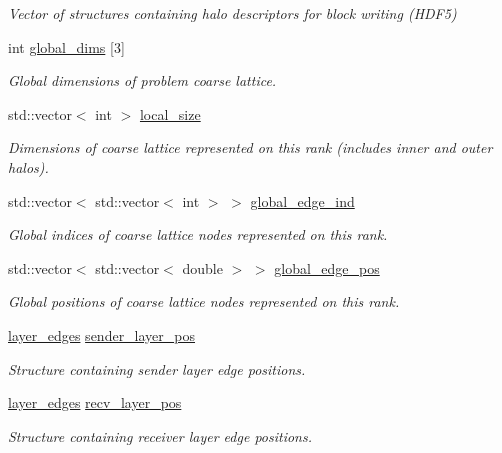 \begin{DoxyCompactItemize}
\begin{DoxyCompactList}\small\item\em Vector of structures containing halo descriptors for block writing (H\+D\+F5) \end{DoxyCompactList}\item 
int \hyperlink{class_mpi_manager_ae41fb382e17680a49821077167bf1905}{global\+\_\+dims} \mbox{[}3\mbox{]}
\begin{DoxyCompactList}\small\item\em Global dimensions of problem coarse lattice. \end{DoxyCompactList}\item 
std\+::vector$<$ int $>$ \hyperlink{class_mpi_manager_ad4a918a4cd19e644ff3295b2854fc6af}{local\+\_\+size}
\begin{DoxyCompactList}\small\item\em Dimensions of coarse lattice represented on this rank (includes inner and outer halos). \end{DoxyCompactList}\item 
std\+::vector$<$ std\+::vector$<$ int $>$ $>$ \hyperlink{class_mpi_manager_a0f994471f9c2986b2c8606b7b716566a}{global\+\_\+edge\+\_\+ind}
\begin{DoxyCompactList}\small\item\em Global indices of coarse lattice nodes represented on this rank. \end{DoxyCompactList}\item 
std\+::vector$<$ std\+::vector$<$ double $>$ $>$ \hyperlink{class_mpi_manager_abd8c87e0a21d31b59d7cc1f7f146d5f4}{global\+\_\+edge\+\_\+pos}
\begin{DoxyCompactList}\small\item\em Global positions of coarse lattice nodes represented on this rank. \end{DoxyCompactList}\item 
\hyperlink{struct_mpi_manager_1_1layer__edges}{layer\+\_\+edges} \hyperlink{class_mpi_manager_a0cb9f8f024ec0a186374995fb203ea1e}{sender\+\_\+layer\+\_\+pos}
\begin{DoxyCompactList}\small\item\em Structure containing sender layer edge positions. \end{DoxyCompactList}\item 
\hyperlink{struct_mpi_manager_1_1layer__edges}{layer\+\_\+edges} \hyperlink{class_mpi_manager_ad1ff57a97ec56efc1690dd3a5a52fd64}{recv\+\_\+layer\+\_\+pos}
\begin{DoxyCompactList}\small\item\em Structure containing receiver layer edge positions. \end{DoxyCompactList}\item 

\end{DoxyCompactItemize}
